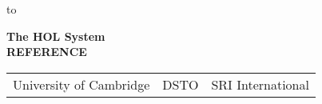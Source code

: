 

\begin{titlepage}
\null\vskip-47pt
\hbox to 

\setcounter{page}{1}		          %

\vspace*{60mm}


\begin{center}
 {\Huge\bf The HOL System}\\[0.4cm]
{\LARGE\bf REFERENCE}\\[2.5cm]
\end{center}

\vspace*{100mm}
\begin{center}
\begin{tabular}{ccc}
University of Cambridge & \hspace*{10ex}DSTO\hspace*{10ex} & SRI International
\end{tabular}
\end{center}

\vfill
\end{titlepage}

\thispagestyle{empty}
\mbox{}
\newpage
